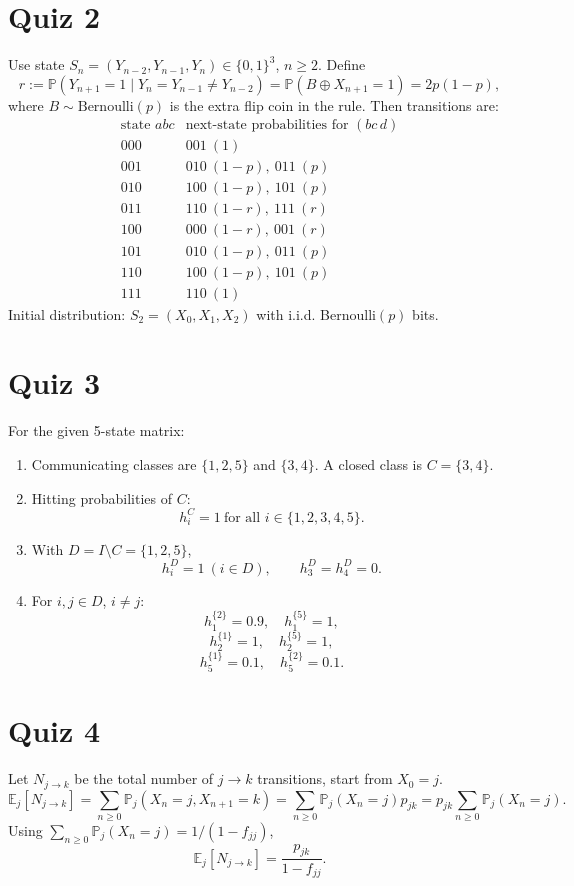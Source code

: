 \documentclass[11pt]{article}
\newcommand{\PP}{\mathbb{P}}
\newcommand{\EE}{\mathbb{E}}
\newcommand{\1}{\mathbf{1}}
\begin{document}
\section{Quiz 2}

Use state $S_n=(Y_{n-2},Y_{n-1},Y_n)\in\{0,1\}^3$, $n\ge2$.
Define
\[
r:=\PP(Y_{n+1}=1\mid Y_n=Y_{n-1}\ne Y_{n-2})
=\PP(B\oplus X_{n+1}=1)=2p(1-p),
\]
where $B\sim\mathrm{Bernoulli}(p)$ is the extra flip coin in the rule.
Then transitions are:
\[
\begin{array}{c|c}
\text{state }abc & \text{next-state probabilities for }(bc\,d)\\\hline
000 & 001\ (1)\\
001 & 010\ (1-p),\ 011\ (p)\\
010 & 100\ (1-p),\ 101\ (p)\\
011 & 110\ (1-r),\ 111\ (r)\\
100 & 000\ (1-r),\ 001\ (r)\\
101 & 010\ (1-p),\ 011\ (p)\\
110 & 100\ (1-p),\ 101\ (p)\\
111 & 110\ (1)
\end{array}
\]
Initial distribution: $S_2=(X_0,X_1,X_2)$ with i.i.d. Bernoulli$(p)$ bits.

\section{Quiz 3}

For the given 5-state matrix:
\begin{enumerate}
\item Communicating classes are $\{1,2,5\}$ and $\{3,4\}$. A closed class is $C=\{3,4\}$.
\item Hitting probabilities of $C$:
\[
h_i^C=1\ \text{for all }i\in\{1,2,3,4,5\}.
\]
\item With $D=I\setminus C=\{1,2,5\}$,
\[
h_i^D=1\ (i\in D),\qquad h_3^D=h_4^D=0.
\]
\item For $i,j\in D$, $i\ne j$:
\[
h_{1}^{\{2\}}=0.9,\quad h_{1}^{\{5\}}=1,
\]
\[
h_{2}^{\{1\}}=1,\quad h_{2}^{\{5\}}=1,
\]
\[
h_{5}^{\{1\}}=0.1,\quad h_{5}^{\{2\}}=0.1.
\]
\end{enumerate}

\section{Quiz 4}

Let $N_{j\to k}$ be the total number of $j\to k$ transitions, start from $X_0=j$.
\[
\EE_j[N_{j\to k}]
=\sum_{n\ge0}\PP_j(X_n=j,X_{n+1}=k)
=\sum_{n\ge0}\PP_j(X_n=j)p_{jk}
=p_{jk}\sum_{n\ge0}\PP_j(X_n=j).
\]
Using $\sum_{n\ge0}\PP_j(X_n=j)=1/(1-f_{jj})$,
\[
\EE_j[N_{j\to k}]=\frac{p_{jk}}{1-f_{jj}}.
\]
\end{document}
